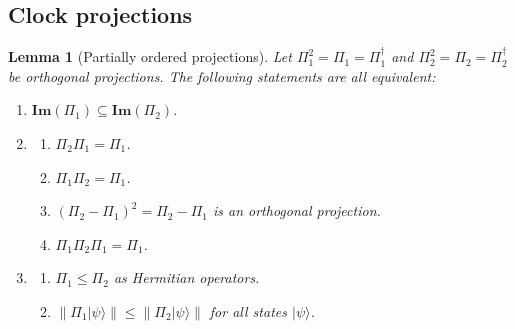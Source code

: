 \documentclass[letterpaper,onecolumn,11pt,accepted=2026-02-14]{quantumarticle}
\newcommand{\norm}[1]{\left\lVert#1\right\rVert}
\newtheorem{lemma}{Lemma}
\theoremstyle{remark}
\theoremstyle{plain}
\newcommand{\ket}[1]{|#1\rangle}
\begin{document}
\subsection{Clock projections}
\label{append:axiom_clock}

\begin{lemma}[Partially ordered projections]
\label{lem:partial_order}
    Let $\Pi_1^2=\Pi_1=\Pi_1^\dagger$ and $\Pi_2^2=\Pi_2=\Pi_2^\dagger$ be orthogonal projections. The following statements are all equivalent:
    \begin{enumerate}
        \item $\mathbf{Im}(\Pi_1)\subseteq\mathbf{Im}(\Pi_2)$.
        \item 
        \begin{enumerate}
            \item $\Pi_2\Pi_1=\Pi_1$.
            \item $\Pi_1\Pi_2=\Pi_1$.
            \item $(\Pi_2-\Pi_1)^2=\Pi_2-\Pi_1$ is an orthogonal projection.
            \item $\Pi_1\Pi_2\Pi_1=\Pi_1$.
        \end{enumerate}
        \item 
        \begin{enumerate}
            \item $\Pi_1\leq\Pi_2$ as Hermitian operators.
            \item $\norm{\Pi_1\ket{\psi}}\leq\norm{\Pi_2\ket{\psi}}$ for all states $\ket{\psi}$.
        \end{enumerate}
    \end{enumerate}
\end{lemma}
\end{document}
